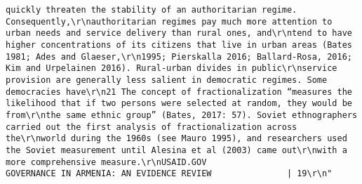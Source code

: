 \documentclass[
]{article}
\begin{document}
\begin{verbatim}
quickly threaten the stability of an authoritarian regime. Consequently,\r\nauthoritarian regimes pay much more attention to urban needs and service delivery than rural ones, and\r\ntend to have higher concentrations of its citizens that live in urban areas (Bates 1981; Ades and Glaeser,\r\n1995; Pierskalla 2016; Ballard-Rosa, 2016; Kim and Urpelainen 2016). Rural-urban divides in public\r\nservice provision are generally less salient in democratic regimes. Some democracies have\r\n21 The concept of fractionalization “measures the likelihood that if two persons were selected at random, they would be from\r\nthe same ethnic group” (Bates, 2017: 57). Soviet ethnographers carried out the first analysis of fractionalization across the\r\nworld during the 1960s (see Mauro 1995), and researchers used the Soviet measurement until Alesina et al (2003) came out\r\nwith a more comprehensive measure.\r\nUSAID.GOV                                                             GOVERNANCE IN ARMENIA: AN EVIDENCE REVIEW               | 19\r\n"                                                                                                                                                                                                                                                                                                                                                                                                                                                                                                                                                                                                                                                                                                          

\end{verbatim}
\end{document}
